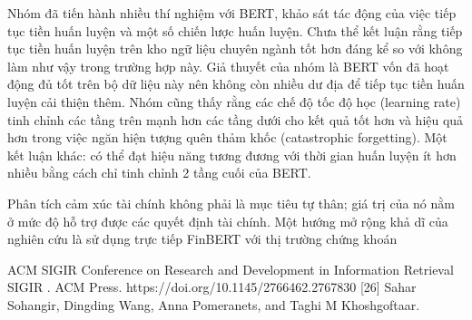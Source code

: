 Nhóm đã tiến hành nhiều thí nghiệm với BERT, khảo sát tác động của việc tiếp tục tiền huấn luyện và một số chiến lược huấn luyện. Chưa thể kết luận rằng tiếp tục tiền huấn luyện trên kho ngữ liệu chuyên ngành tốt hơn đáng kể so với không làm như vậy trong trường hợp này. Giả thuyết của nhóm là BERT vốn đã hoạt động đủ tốt trên bộ dữ liệu này nên không còn nhiều dư địa để tiếp tục tiền huấn luyện cải thiện thêm. Nhóm cũng thấy rằng các chế độ tốc độ học (learning rate) tinh chỉnh các tầng trên mạnh hơn các tầng dưới cho kết quả tốt hơn và hiệu quả hơn trong việc ngăn hiện tượng quên thảm khốc (catastrophic forgetting). Một kết luận khác: có thể đạt hiệu năng tương đương với thời gian huấn luyện ít hơn nhiều bằng cách chỉ tinh chỉnh 2 tầng cuối của BERT.

Phân tích cảm xúc tài chính không phải là mục tiêu tự thân; giá trị của nó nằm ở mức độ hỗ trợ được các quyết định tài chính. Một hướng mở rộng khả dĩ của nghiên cứu là sử dụng trực tiếp FinBERT với thị trường chứng khoán

ACM SIGIR Conference on Research and Development in Information Retrieval SIGIR . ACM Press. https://doi.org/10.1145/2766462.2767830 {[}26{]} Sahar Sohangir, Dingding Wang, Anna Pomeranets, and Taghi M Khoshgoftaar.

